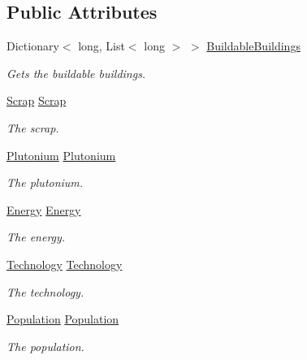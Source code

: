 \subsection*{Public Attributes}
\begin{DoxyCompactItemize}
\item 
Dictionary$<$ long, List$<$ long $>$ $>$ \hyperlink{classCore_1_1Models_1_1Account_a3414ce3d42e302213821d9846c8fb1b9}{Buildable\+Buildings}
\begin{DoxyCompactList}\small\item\em Gets the buildable buildings. \end{DoxyCompactList}\item 
\hyperlink{classCore_1_1Models_1_1Resources_1_1Scrap}{Scrap} \hyperlink{classCore_1_1Models_1_1Account_afa0a8a7e0abbc6b65e60d94fabf919ed}{Scrap}
\begin{DoxyCompactList}\small\item\em The scrap. \end{DoxyCompactList}\item 
\hyperlink{classCore_1_1Models_1_1Resources_1_1Plutonium}{Plutonium} \hyperlink{classCore_1_1Models_1_1Account_a72ac9d63dede3a8321003ffafe1546ca}{Plutonium}
\begin{DoxyCompactList}\small\item\em The plutonium. \end{DoxyCompactList}\item 
\hyperlink{classCore_1_1Models_1_1Resources_1_1Energy}{Energy} \hyperlink{classCore_1_1Models_1_1Account_a903274c37ced8923aa8f271f8e3c41b4}{Energy}
\begin{DoxyCompactList}\small\item\em The energy. \end{DoxyCompactList}\item 
\hyperlink{classCore_1_1Models_1_1Resources_1_1Technology}{Technology} \hyperlink{classCore_1_1Models_1_1Account_acab414d9e49038c2f7c873a22621bff8}{Technology}
\begin{DoxyCompactList}\small\item\em The technology. \end{DoxyCompactList}\item 
\hyperlink{classCore_1_1Models_1_1Resources_1_1Population}{Population} \hyperlink{classCore_1_1Models_1_1Account_a3b9000ade8b8742512e802fa4bea3d7c}{Population}
\begin{DoxyCompactList}\small\item\em The population. \end{DoxyCompactList}\end{DoxyCompactItemize}
